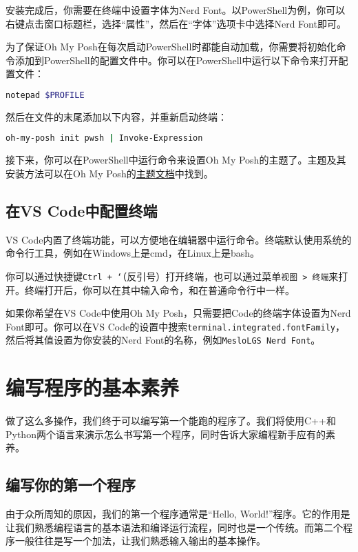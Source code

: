 安装完成后，你需要在终端中设置字体为Nerd Font。以PowerShell为例，你可以右键点击窗口标题栏，选择“属性”，然后在“字体”选项卡中选择Nerd Font即可。

为了保证Oh My Posh在每次启动PowerShell时都能自动加载，你需要将初始化命令添加到PowerShell的配置文件中。你可以在PowerShell中运行以下命令来打开配置文件：
\begin{lstlisting}[language=bash]
  notepad $PROFILE
\end{lstlisting}

然后在文件的末尾添加以下内容，并重新启动终端：
\begin{lstlisting}[language=bash]
  oh-my-posh init pwsh | Invoke-Expression
\end{lstlisting}

接下来，你可以在PowerShell中运行命令来设置Oh My Posh的主题了。主题及其安装方法可以在Oh My Posh的\href{https://ohmyposh.dev/docs/themes}{主题文档}中找到。

\subsection{在VS Code中配置终端}

VS Code内置了终端功能，可以方便地在编辑器中运行命令。终端默认使用系统的命令行工具，例如在Windows上是cmd，在Linux上是bash。

你可以通过快捷键\texttt{Ctrl + `}（反引号）打开终端，也可以通过菜单\texttt{视图 > 终端}来打开。终端打开后，你可以在其中输入命令，和在普通命令行中一样。

如果你希望在VS Code中使用Oh My Posh，只需要把Code的终端字体设置为Nerd Font即可。你可以在VS Code的设置中搜索\texttt{terminal.integrated.fontFamily}，然后将其值设置为你安装的Nerd Font的名称，例如\texttt{MesloLGS Nerd Font}。

\section{编写程序的基本素养}

做了这么多操作，我们终于可以编写第一个能跑的程序了。我们将使用C++和Python两个语言来演示怎么书写第一个程序，同时告诉大家编程新手应有的素养。

\subsection{编写你的第一个程序}

由于众所周知的原因，我们的第一个程序通常是“Hello, World!”程序。它的作用是让我们熟悉编程语言的基本语法和编译运行流程，同时也是一个传统。而第二个程序一般往往是写一个加法，让我们熟悉输入输出的基本操作。

